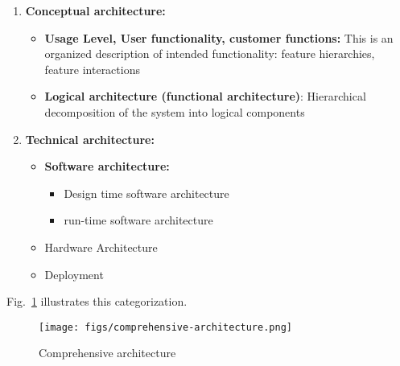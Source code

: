 \documentclass{llncs} %
\begin{document}
\begin{enumerate}
  \item \textbf{Conceptual architecture:}
				\begin{itemize}
           	\item \textbf{Usage Level, User functionality, customer functions:}
						   This is an organized    description of intended functionality:
							 feature hierarchies,  feature interactions
            \item \textbf{Logical architecture (functional architecture)}: 							
						      Hierarchical decomposition of the system into logical components
  				\end{itemize}
	\item \textbf{Technical architecture:}
           \begin{itemize}
               	\item \textbf{Software architecture:}
								      \begin{itemize}
												\item Design time software architecture
												 \item run-time software architecture
											\end{itemize}
								\item Hardware Architecture
								\item Deployment
            \end{itemize}
\end{enumerate}

Fig.~\ref{fig:comprehensive} illustrates this categorization.

\begin{figure}%
\begin{center}
\texttt{[image: figs/comprehensive-architecture.png]}%
\caption{Comprehensive architecture}%
\label{fig:comprehensive}%
\end{center}
\end{figure}






\end{document}
